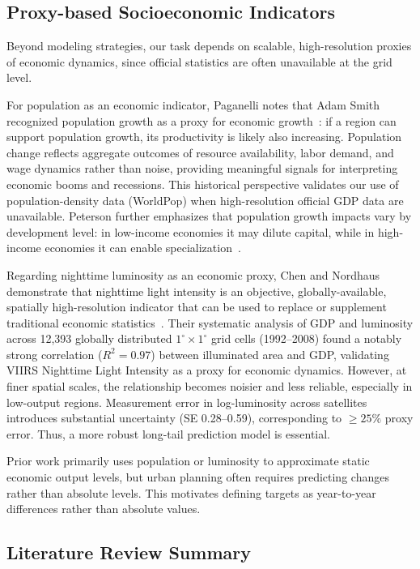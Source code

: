 \documentclass[preprint,12pt]{elsarticle}
\begin{document}
\subsection{Proxy-based Socioeconomic Indicators}
Beyond modeling strategies, our task depends on scalable, high-resolution proxies of economic dynamics, since official statistics are often unavailable at the grid level.

For population as an economic indicator, Paganelli notes that Adam Smith recognized population growth as a proxy for economic growth~\cite{paganelli2021populationgdp}: if a region can support population growth, its productivity is likely also increasing. Population change reflects aggregate outcomes of resource availability, labor demand, and wage dynamics rather than noise, providing meaningful signals for interpreting economic booms and recessions. This historical perspective validates our use of population-density data (WorldPop) when high-resolution official GDP data are unavailable. Peterson further emphasizes that population growth impacts vary by development level: in low-income economies it may dilute capital, while in high-income economies it can enable specialization~\cite{peterson2017rolepopulation}.

Regarding nighttime luminosity as an economic proxy, Chen and Nordhaus demonstrate that nighttime light intensity is an objective, globally-available, spatially high-resolution indicator that can be used to replace or supplement traditional economic statistics~\cite{chen2011luminosity}. Their systematic analysis of GDP and luminosity across 12,393 globally distributed $1^{\circ} \times 1^{\circ}$ grid cells (1992--2008) found a notably strong correlation ($R^2 = 0.97$) between illuminated area and GDP, validating VIIRS Nighttime Light Intensity as a proxy for economic dynamics. However, at finer spatial scales, the relationship becomes noisier and less reliable, especially in low-output regions. Measurement error in log-luminosity across satellites introduces substantial uncertainty (SE 0.28--0.59), corresponding to $\ge 25\%$ proxy error. Thus, a more robust long-tail prediction model is essential.

Prior work primarily uses population or luminosity to approximate static economic output levels, but urban planning often requires predicting changes rather than absolute levels. This motivates defining targets as year-to-year differences rather than absolute values.

\subsection{Literature Review Summary}
\end{document}
